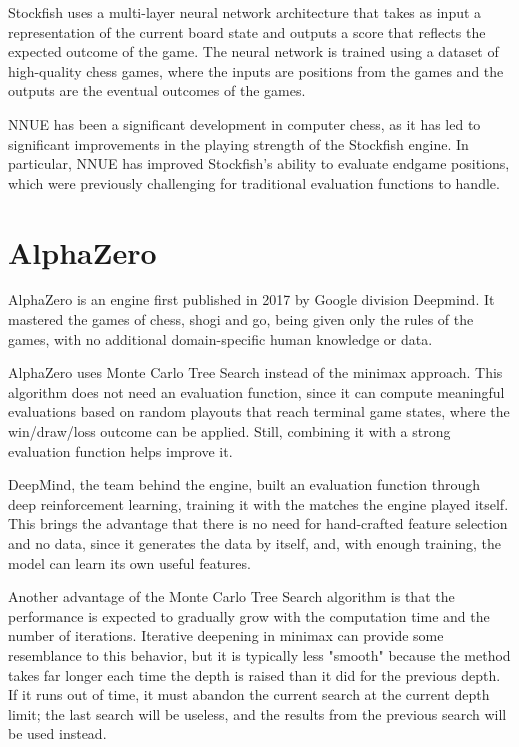 Stockfish uses a multi-layer neural network architecture that takes as input a representation of the current board state and outputs a score that reflects the expected outcome of the game. The neural network is trained using a dataset of high-quality chess games, where the inputs are positions from the games and the outputs are the eventual outcomes of the games.

NNUE has been a significant development in computer chess, as it has led to significant improvements in the playing strength of the Stockfish engine. In particular, NNUE has improved Stockfish's ability to evaluate endgame positions, which were previously challenging for traditional evaluation functions to handle.

\section{AlphaZero}
\label{sec:ch3sec4}

AlphaZero is an engine first published in 2017 by Google division Deepmind. It mastered the games of chess, shogi and go, being given only the rules of the games, with no additional domain-specific human knowledge or data.

AlphaZero uses Monte Carlo Tree Search instead of the minimax approach. This algorithm does not need an evaluation function, since it can compute meaningful evaluations based on random playouts that reach terminal game states, where the win/draw/loss outcome can be applied. Still, combining it with a strong evaluation function helps improve it.

DeepMind, the team behind the engine, built an evaluation function through deep reinforcement learning, training it with the matches the engine played itself. This brings the advantage that there is no need for hand-crafted feature selection and no data, since it generates the data by itself, and, with enough training, the model can learn its own useful features.

Another advantage of the Monte Carlo Tree Search algorithm is that the performance is expected to gradually grow with the computation time and the number of iterations. Iterative deepening in minimax can provide some resemblance to this behavior, but it is typically less "smooth" because the method takes far longer each time the depth is raised than it did for the previous depth. If it runs out of time, it must abandon the current search at the current depth limit; the last search will be useless, and the results from the previous search will be used instead.

